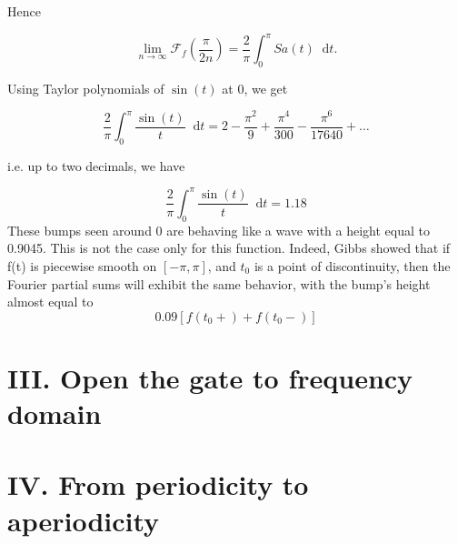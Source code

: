 \documentclass[margin,line]{res}
\newcommand*{\dif}{\mathop{}\!\mathrm{d}}
\begin{document}
\begin{resume}
Hence

$$
\lim_{n \rightarrow \infty} \mathscr{F}_f \left(\frac{\pi}{2n}\right) = \frac{2}{\pi}\int_{0}^{\pi}Sa(t) \dif t.
$$

Using Taylor polynomials of $\sin(t)$ at 0, we get

$$
\frac{2}{\pi}\int_{0}^{\pi}\frac{\sin(t)}{t} \dif t = 2 - \frac{\pi^2}{9} + \frac{\pi^4}{300} - \frac{\pi^6}{17640}+\ldots
$$

i.e. up to two decimals, we have

$$
\frac{2}{\pi}\int_{0}^{\pi}\frac{\sin(t)}{t} \dif t = 1.18
$$
These bumps seen around 0 are behaving like a wave with a height equal to 0.9045. This is not the case only for this function. Indeed, Gibbs showed that if f(t) is piecewise smooth on $[-\pi,\pi]$, and $t_0$ is a point of discontinuity, then the Fourier partial sums will exhibit the same behavior, with the bump's height almost equal to 
$$
0.09\left[ f(t_0+) + f(t_0-)\right]
$$
\clearpage

\section{\sc III. Open the gate to frequency domain}
\clearpage

\section{\sc IV. From periodicity to aperiodicity}
\clearpage

\end{resume}
\end{document}

